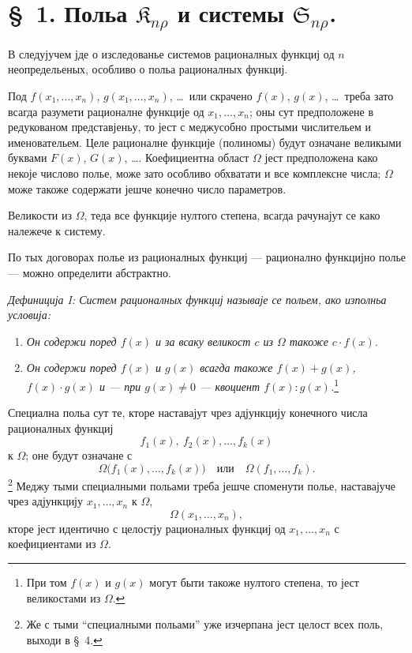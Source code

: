 ﻿\documentclass[11pt]{article}
\providecommand{\Kfield}{\mathfrak{K}}
\providecommand{\Ssys}{\mathfrak{S}}
\begin{document}
\section*{\S\ 1. Польа $\Kfield_{n\rho}$ и системы $\Ssys_{n\rho}$.}

В следујучем јде о изследованье системов рационалных функциј од $n$ неопредельеных, особливо о польа рационалных функциј.

Под $f(x_1,\ldots,x_n)$, $g(x_1,\ldots,x_n)$, \ldots\ или скрачено $f(x)$, $g(x)$, \ldots\ треба зато всагда разумети рационалне функције од $x_1,\ldots,x_n$; оны сут предположене в редукованом представјеньу, то јест с меджусобно простыми числительем и именовательем. Целе рационалне функције (полиномы) будут означане великыми буквами $F(x)$, $G(x)$, \ldots. Коефициентна област $\Omega$ јест предположена како некоје числово полье, може зато особливо обхватати и все комплексне числа; $\Omega$ може такоже содержати јешче конечно число параметров.

Великости из $\Omega$, теда все функције нултого степена, всагда рачунајут се како належече к систему.

По тых договорах полье из рационалных функциј --- рационално функцијно полье --- можно определити абстрактно.

{\itshape Дефиниција I: Систем рационалных функциј называје се польем, ако изполньа условија:}
\begin{enumerate}
\item {\itshape Он содержи поред $f(x)$ и за всаку великост $c$ из $\Omega$ такоже $c\cdot f(x)$.}
\item {\itshape Он содержи поред $f(x)$ и $g(x)$ всагда такоже $f(x)+g(x)$, $f(x)\cdot g(x)$ и --- при $g(x)\ne0$ --- квоциент $f(x):g(x)$.}\footnote{При том $f(x)$ и $g(x)$ могут быти такоже нултого степена, то јест великостами из $\Omega$.}
\end{enumerate}
Специална польа сут те, кторе наставајут чрез адјункцију конечного числа рационалных функциј
\[
  f_1(x),\ f_2(x),\ldots, f_k(x)
\]
к $\Omega$; оне будут означане с
\[
  \Omega\bigl(f_1(x),\ldots,f_k(x)\bigr)
  \quad\text{или}\quad
  \Omega(f_1,\ldots,f_k).
\]
\footnote{Же с тыми ``специалными польами'' уже изчерпана јест целост всех поль, выходи в \S\ 4.}
Меджу тыми специалными польами треба јешче споменути полье, наставајуче чрез адјункцију $x_1,\ldots,x_n$ к $\Omega$,
\[
  \Omega(x_1,\ldots,x_n),
\]
кторе јест идентично с целостју рационалных функциј од $x_1,\ldots,x_n$ с коефициентами из $\Omega$.
\end{document}
